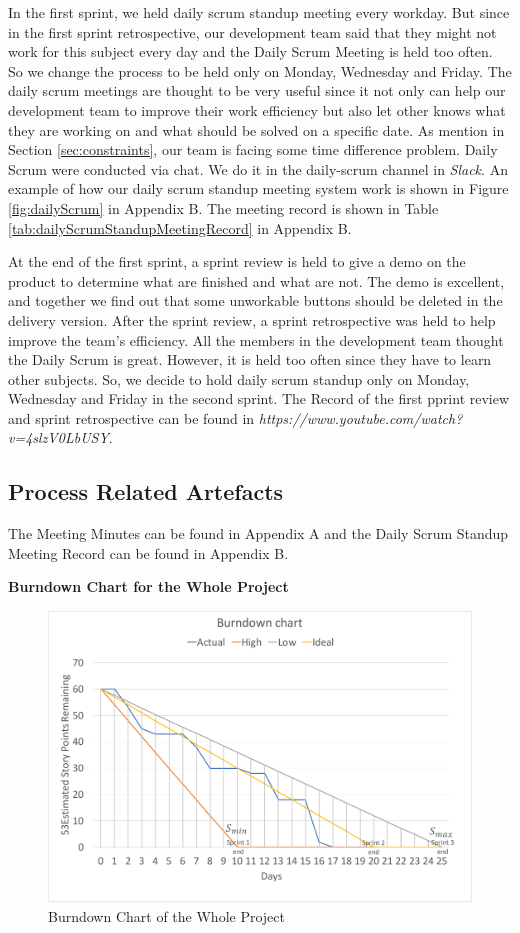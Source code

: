 In the first sprint, we held daily scrum standup meeting every workday. But since in the first sprint retrospective, our development team said that they might not work for this subject every day and the Daily Scrum Meeting is held too often. So we change the process to be held only on Monday, Wednesday and Friday. The daily scrum meetings are thought to be very useful since it not only can help our development team to improve their work efficiency but also let other knows what they are working on and what should be solved on a specific date. As mention in Section \ref{sec:constraints}, our team is facing some time difference problem. Daily Scrum were conducted via chat. We do it in the daily-scrum channel in \textit{Slack}. An example of how our daily scrum standup meeting system work is shown in Figure \ref{fig:dailyScrum} in Appendix B. The meeting record is shown in Table \ref{tab:dailyScrumStandupMeetingRecord} in Appendix B.

At the end of the first sprint, a sprint review is held to give a demo on the product to determine what are finished and what are not. The demo is excellent, and together we find out that some unworkable buttons should be deleted in the delivery version. After the sprint review, a sprint retrospective was held to help improve the team's efficiency. All the members in the development team thought the Daily Scrum is great. However, it is held too often since they have to learn other subjects. So, we decide to hold daily scrum standup only on Monday, Wednesday and Friday in the second sprint. The Record of the first pprint review and sprint retrospective can be found in \textit{https://www.youtube.com/watch?v=4slzV0LbUSY}.

\subsection{Process Related Artefacts}  
The Meeting Minutes can be found in Appendix A and the Daily Scrum Standup Meeting Record can be found in Appendix B. 

\textbf{Burndown Chart for the Whole Project}

\begin{figure}[htp]
\centering
\includegraphics[width=\textwidth]{Figures/totalBurndown.pdf}
\caption{Burndown Chart of the Whole Project}
\label{fig:totalBurndown}
\end{figure}

